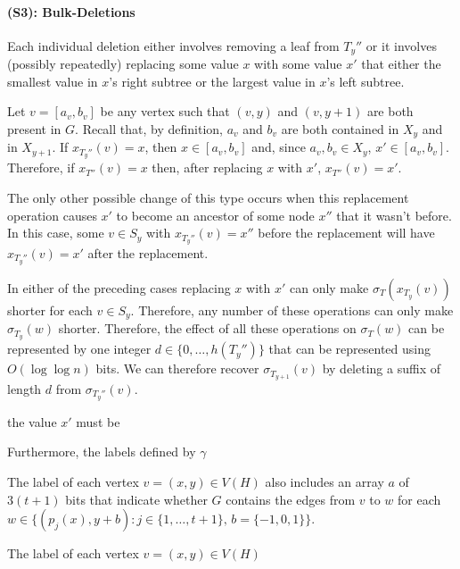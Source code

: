 \documentclass[kpfonts]{patmorin}
\begin{document}
\paragraph{(S3): Bulk-Deletions}

Each individual deletion either involves removing a leaf from $T_y''$ or it involves (possibly repeatedly) replacing some value $x$ with some value $x'$ that either the smallest value in $x$'s right subtree or the largest value in $x$'s left subtree.

Let $v=[a_v,b_v]$ be any vertex such that $(v,y)$ and $(v,y+1)$ are both present in $G$.  Recall that, by definition, $a_v$ and $b_v$ are both contained in $X_y$ and in $X_{y+1}$.  If $x_{T_y''}(v)=x$, then $x\in[a_v,b_v]$ and, since $a_v,b_v\in X_{y}$, $x'\in[a_v,b_v]$.  Therefore, if $x_{T''}(v)=x$ then, after replacing $x$ with $x'$, $x_{T''}(v)=x'$.  

The only other possible change of this type occurs when this replacement operation causes $x'$ to become an ancestor of some node $x''$ that it wasn't before.  In this case, some $v\in S_y$ with $x_{T_y''}(v)=x''$ before the replacement will have $x_{T_y''}(v)=x'$ after the replacement.

In either of the preceding cases replacing $x$ with $x'$ can only make $\sigma_T(x_{T_y}(v))$ shorter for each $v\in S_y$.  Therefore, any number of these operations can only make $\sigma_{T_y}(w)$ shorter.  Therefore, the effect of all these operations on $\sigma_T(w)$ can be represented by one integer $d\in \{0,\ldots,h(T_y'')\}$ that can be represented using $O(\log\log n)$ bits.   We can therefore recover $\sigma_{T_{y+1}}(v)$ by deleting a suffix of length $d$ from $\sigma_{T_y''}(v)$.



the value $x'$ must be 



Furthermore, the labels defined by $\gamma$

The label of each vertex $v=(x,y)\in V(H)$ also includes an array $a$ of $3(t+1)$ bits that indicate whether $G$ contains the edges from $v$ to $w$ for each $w\in\{(p_j(x),y+b):j\in\{1,\ldots,t+1\},\, b=\{-1,0,1\}\}$. 

The label of each vertex $v=(x,y)\in V(H)$
\end{document}
